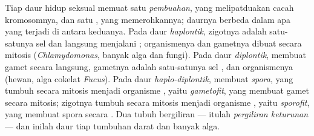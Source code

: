 \begin{definition}\label{def:b2:plant-life-cycles:cycles}
Tiap daur hidup seksual memuat satu \emph{pembuahan}, yang
melipatduakan cacah kromosomnya, dan satu \emph{}, yang
memerohkannya; daurnya berbeda dalam apa yang terjadi di antara
keduanya. Pada daur \emph{haplontik}, zigotnya adalah satu-satunya sel
 dan langsung menjalani ; organismenya  dan
gametnya dibuat secara mitosis (\emph{Chlamydomonas}, banyak alga dan
fungi). Pada daur \emph{diplontik},  membuat gamet secara
langsung, gametnya adalah satu-satunya sel , dan organismenya
 (hewan, alga cokelat \emph{Fucus}). Pada daur
\emph{haplo-diplontik},  membuat \emph{spora}, yang tumbuh
secara mitosis menjadi organisme , yaitu \emph{gametofit}, yang
membuat gamet secara mitosis; zigotnya tumbuh secara mitosis menjadi
organisme , yaitu \emph{sporofit}, yang membuat spora secara
. Dua tubuh  bergiliran --- itulah
\emph{pergiliran keturunan} --- dan inilah daur tiap tumbuhan darat
dan banyak alga.
\end{definition}

